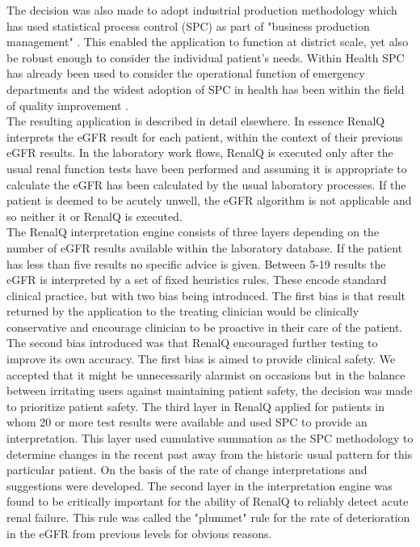 \documentclass[11pt]{article}
\begin{document}
The decision was also made to adopt industrial production methodology which has used statistical process control (SPC) as part of "business production management" \citep{rosemann2015six, cheng2015run, epprecht2015statistical}. This enabled the application to function at district scale, yet also be robust enough to consider the individual patient's needs. Within Health SPC has already been used to consider the operational function of emergency departments \citep{pimentel2015statistical} and the widest adoption of SPC in health has been within the field of quality improvement \citep{provost2011health}.\\

The resulting application is described in detail elsewhere\citep{GodfreyEtAl2014KidneyPaper}. In essence RenalQ interprets the eGFR result for each patient, within the context of their previous eGFR results. In the laboratory work flows, RenalQ is executed only after the usual renal function tests have been performed and assuming it is appropriate to calculate the eGFR has been calculated by the usual laboratory processes. If the patient is deemed to be acutely unwell, the eGFR algorithm is not applicable and so neither it or RenalQ is executed.\\

The RenalQ interpretation engine consists of three layers depending on the number of eGFR results available within the laboratory database. If the patient has less than five results no specific advice is given. Between 5-19 results the eGFR is interpreted by a set of fixed heuristics rules. These encode standard clinical practice, but with two bias being introduced. The first bias is that result returned by the application to the treating clinician would be clinically conservative and encourage clinician to be proactive in their care of the patient. The second bias introduced was that RenalQ encouraged further testing to improve its own accuracy. The first bias is aimed to provide clinical safety. We accepted that it might be unnecessarily alarmist on occasions but in the balance between irritating users against maintaining patient safety, the decision was made to prioritize patient safety. The third layer in RenalQ applied for patients in whom 20 or more test results were available and used SPC to provide an interpretation. This layer used cumulative summation as the SPC methodology to determine changes in the recent past away from the historic usual pattern for this particular patient. On the basis of the rate of change interpretations and suggestions were developed. The second layer in the interpretation engine was found to be critically important for the ability of RenalQ to reliably detect acute renal failure. This rule was called the "plummet" rule for the rate of deterioration in the eGFR from previous levels for obvious reasons. \\
\end{document}

